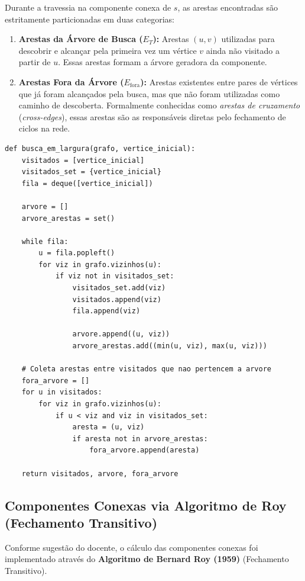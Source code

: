 \documentclass[12pt,a4paper]{article}
\begin{document}
Durante a travessia na componente conexa de $s$, as arestas encontradas são estritamente particionadas em duas categorias:
\begin{enumerate}
    \item \textbf{Arestas da Árvore de Busca ($E_T$):} Arestas $(u, v)$ utilizadas para descobrir e alcançar pela primeira vez um vértice $v$ ainda não visitado a partir de $u$. Essas arestas formam a árvore geradora da componente.
    \item \textbf{Arestas Fora da Árvore ($E_{\text{fora}}$):} Arestas existentes entre pares de vértices que já foram alcançados pela busca, mas que não foram utilizadas como caminho de descoberta. Formalmente conhecidas como \textit{arestas de cruzamento} (\textit{cross-edges}), essas arestas são as responsáveis diretas pelo fechamento de ciclos na rede.
\end{enumerate}

\begin{lstlisting}[caption={Implementação da Busca em Largura em \texttt{conectividade.py}}, label={cod:bfs}]
def busca_em_largura(grafo, vertice_inicial):
    visitados = [vertice_inicial]
    visitados_set = {vertice_inicial}
    fila = deque([vertice_inicial])

    arvore = []
    arvore_arestas = set()

    while fila:
        u = fila.popleft()
        for viz in grafo.vizinhos(u):
            if viz not in visitados_set:
                visitados_set.add(viz)
                visitados.append(viz)
                fila.append(viz)

                arvore.append((u, viz))
                arvore_arestas.add((min(u, viz), max(u, viz)))

    # Coleta arestas entre visitados que nao pertencem a arvore
    fora_arvore = []
    for u in visitados:
        for viz in grafo.vizinhos(u):
            if u < viz and viz in visitados_set:
                aresta = (u, viz)
                if aresta not in arvore_arestas:
                    fora_arvore.append(aresta)

    return visitados, arvore, fora_arvore
\end{lstlisting}

\subsection{Componentes Conexas via Algoritmo de Roy (Fechamento Transitivo)}
Conforme sugestão do docente, o cálculo das componentes conexas foi implementado através do \textbf{Algoritmo de Bernard Roy (1959)} (Fechamento Transitivo).
\end{document}
